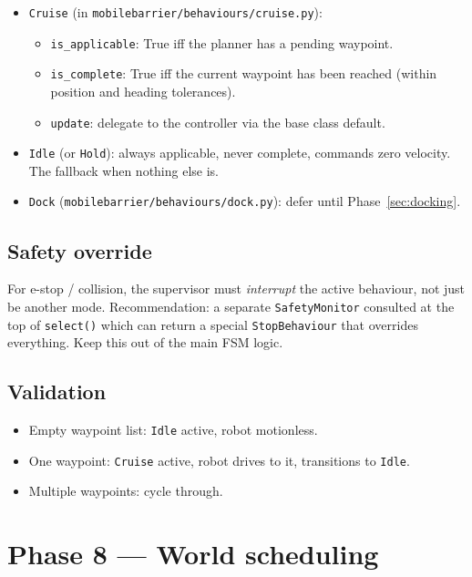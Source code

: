 \documentclass[11pt,a4paper]{article}
\newcommand{\code}[1]{\texttt{\small #1}}
\begin{document}
\begin{itemize}
    \item \code{Cruise} (in \code{mobilebarrier/behaviours/cruise.py}):
        \begin{itemize}
            \item \code{is\_applicable}: True iff the planner has a
                pending waypoint.
            \item \code{is\_complete}: True iff the current waypoint has
                been reached (within position and heading tolerances).
            \item \code{update}: delegate to the controller via the base
                class default.
        \end{itemize}
    \item \code{Idle} (or \code{Hold}): always applicable, never complete,
        commands zero velocity. The fallback when nothing else is.
    \item \code{Dock} (\code{mobilebarrier/behaviours/dock.py}): defer
        until Phase~\ref{sec:docking}.
\end{itemize}

\subsection*{Safety override}

For e-stop / collision, the supervisor must \emph{interrupt} the active
behaviour, not just be another mode. Recommendation: a separate
\code{SafetyMonitor} consulted at the top of \code{select()} which can
return a special \code{StopBehaviour} that overrides everything. Keep this
out of the main FSM logic.

\subsection*{Validation}

\begin{itemize}
    \item Empty waypoint list: \code{Idle} active, robot motionless.
    \item One waypoint: \code{Cruise} active, robot drives to it,
        transitions to \code{Idle}.
    \item Multiple waypoints: cycle through.
\end{itemize}

\section{Phase 8 --- World scheduling}
\label{sec:scheduling}
\end{document}
